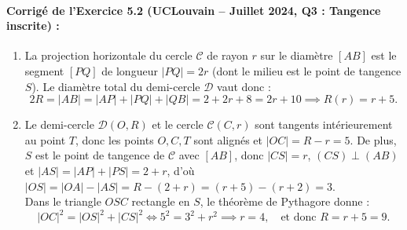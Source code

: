 \paragraph{Corrigé de l'Exercice 5.2 (UCLouvain -- Juillet 2024, Q3 : Tangence inscrite) :}
\begin{enumerate}[label=(\alph*)]
    \item La projection horizontale du cercle $\mathcal{C}$ de rayon $r$ sur le diamètre $[AB]$ est le segment $[PQ]$ de longueur $|PQ| = 2r$ (dont le milieu est le point de tangence $S$). Le diamètre total du demi-cercle $\mathcal{D}$ vaut donc :
    \[
        2R = |AB| = |AP| + |PQ| + |QB| = 2 + 2r + 8 = 2r + 10 \implies \boxed{R(r) = r + 5}.
    \]
    \item Le demi-cercle $\mathcal{D}(O, R)$ et le cercle $\mathcal{C}(C, r)$ sont tangents intérieurement au point $T$, donc les points $O, C, T$ sont alignés et $|OC| = R - r = 5$. De plus, $S$ est le point de tangence de $\mathcal{C}$ avec $[AB]$, donc $|CS| = r$, $(CS) \perp (AB)$ et $|AS| = |AP| + |PS| = 2 + r$, d'où $|OS| = |OA| - |AS| = R - (2+r) = (r+5) - (r+2) = 3$.\\
    Dans le triangle $OSC$ rectangle en $S$, le théorème de Pythagore donne :
    \[
        |OC|^2 = |OS|^2 + |CS|^2 \iff 5^2 = 3^2 + r^2 \implies r = 4, \quad \text{et donc } \boxed{R = r + 5 = 9}.
    \]
\end{enumerate}

